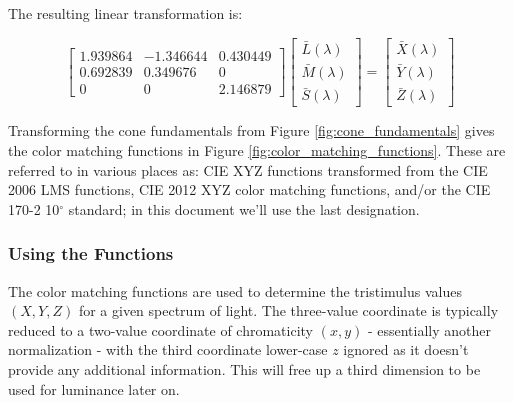 \documentclass{article}
\begin{document}
\begin{multicols}{2}
The resulting linear transformation is:

\begin{equation}\label{eq:lms_to_xyz_10} %
    \begin{bmatrix}
        1.939864&-1.346644&0.430449\\
        0.692839&0.349676&0\\
        0&0&2.146879
    \end{bmatrix}\begin{bmatrix}
        \bar{L}(\lambda)\\
        \bar{M}(\lambda)\\
        \bar{S}(\lambda)
    \end{bmatrix}=\begin{bmatrix}
        \bar{X}(\lambda)\\
        \bar{Y}(\lambda)\\
        \bar{Z}(\lambda)
    \end{bmatrix}
\end{equation}

Transforming the cone fundamentals from Figure \ref{fig:cone_fundamentals} gives the color matching functions in Figure \ref{fig:color_matching_functions}.  These are referred to in various places as: CIE XYZ functions transformed from the CIE 2006 LMS functions, CIE 2012 XYZ color matching functions, and/or the CIE 170-2 10$^\circ$ standard; in this document we'll use the last designation.

\subsubsection{Using the Functions} %

The color matching functions are used to determine the tristimulus values $(X,Y,Z)$ for a given spectrum of light.  The three-value coordinate is typically reduced to a two-value coordinate of chromaticity $(x,y)$ - essentially another normalization - with the third coordinate lower-case $z$ ignored as it doesn't provide any additional information.  This will free up a third dimension to be used for luminance later on.


\end{multicols}
\end{document}
